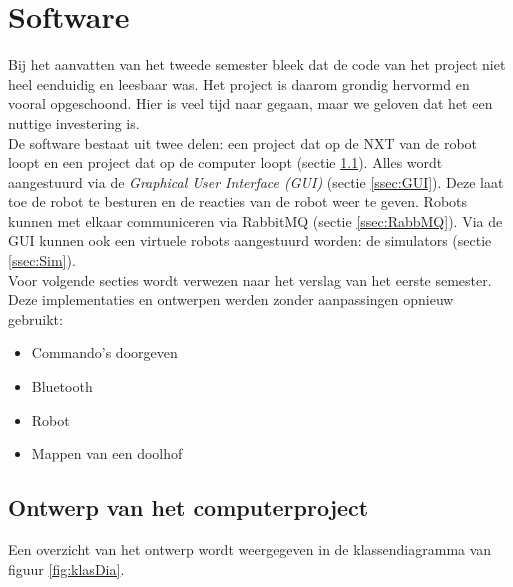 \documentclass[tt1]{penoverslag}
\begin{document}
\section{Software}
\label{secc:softw}

Bij het aanvatten van het tweede semester bleek dat de code van het project niet heel eenduidig en leesbaar was. Het project is daarom grondig hervormd en vooral opgeschoond. Hier is veel tijd naar gegaan, maar we geloven dat het een nuttige investering is.\\

De software bestaat uit twee delen: een project dat op de NXT van de robot loopt en een project dat op de computer loopt (sectie \ref{ssec:Sdesign}). Alles wordt aangestuurd via de \textit{Graphical User Interface (GUI)} (sectie \ref{ssec:GUI}). Deze laat toe de robot te besturen en de reacties van de robot weer te geven. Robots kunnen met elkaar communiceren via RabbitMQ (sectie \ref{ssec:RabbMQ}). Via de GUI kunnen ook een virtuele robots aangestuurd worden: de simulators (sectie \ref{ssec:Sim}).\\

Voor volgende secties wordt verwezen naar het verslag van het eerste semester. Deze implementaties en ontwerpen werden zonder aanpassingen opnieuw gebruikt:

\begin{itemize}
\item Commando's doorgeven
\item Bluetooth
\item Robot
\item Mappen van een doolhof
\end{itemize}

\subsection{Ontwerp van het computerproject}
\label{ssec:Sdesign}
Een overzicht van het ontwerp wordt weergegeven in de klassendiagramma van figuur \ref{fig:klasDia}.\\
\end{document}
